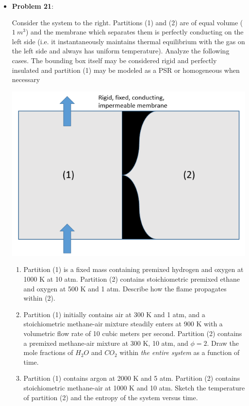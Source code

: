 \documentclass[11pt]{article}
\newcommand{\Item}[1]{\item \textbf{#1}:}
\newcommand{\Problem}[1]{\Item{Problem #1}}
\begin{document}
\begin{itemize}
\Problem{21} \\
\begin{minipage}{0.46\textwidth}
Consider the system to the right. Partitions (1) and (2) are of equal volume ($1\ m^3$) and the membrane which separates them is perfectly conducting on the left side (i.e. it instantaneously maintains thermal equilibrium with the gas on the left side and always has uniform temperature). Analyze the following cases. The bounding box itself may be considered rigid and perfectly insulated and partition (1) may be modeled as a PSR or homogeneous when necessary
\end{minipage}
\begin{minipage}{0.48\textwidth}
\centering
\includegraphics[width=\textwidth]{Graphics/weird_box_system.PNG}
\end{minipage}
\begin{enumerate}[label=\alph*)]
\item Partition (1) is a fixed mass containing premixed hydrogen and oxygen at 1000 K at 10 atm. Partition (2) contains stoichiometric premixed ethane and oxygen at 500 K and 1 atm. Describe how the flame propagates within (2).
\item Partition (1) initially contains air at 300 K and 1 atm, and a stoichiometric methane-air mixture steadily enters at 900 K with a volumetric flow rate of 10 cubic meters per second. Partition (2) contains a premixed methane-air mixture at 300 K, 10 atm, and $\phi=2$. Draw the mole fractions of $H_2O$ and $CO_2$ within \emph{the entire system} as a function of time.
\item Partition (1) contains argon at 2000 K and 5 atm. Partition (2) contains stoichiometric methane-air at 1000 K and 10 atm. Sketch the temperature of partition (2) and the entropy of the system versus time.

\end{enumerate}
\end{itemize}
\end{document}
